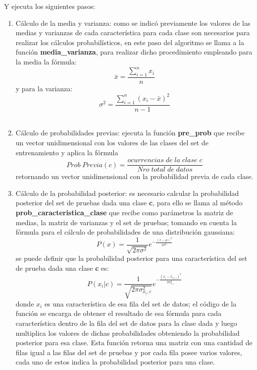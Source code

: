 Y ejecuta los siguientes pasos:
\begin{enumerate}
	\item Cálculo de la media y varianza:
	como se indicó previamente los valores de las medias y varianzas de cada característica para cada clase son necesarios
	para realizar los cálculos probabilísticos, en este paso del algoritmo se llama a la función \textbf{media\_varianza}, para
	realizar dicho procedimiento empleando para la media la fórmula: \[\bar{x}=\frac{\sum_{i=1}^n{x_{i}}}{n}\] y para la varianza:
	\[\sigma^2=\frac{\sum_{i=1}^n{\left(x_{i}-\bar{x}\right)^2}}{n - 1}\]\\
	\item Cálculo de probabilidades previas:
	ejecuta la función \textbf{pre\_prob} que recibe un vector unidimensional con los valores de las clases
	del set de entrenamiento y aplica la fórmula
	\[Prob\;Previa\left(c\right)=\frac{ocurrencias\;de\;la\;clase\;c}{Nro\;total\;de\;datos}\]
	retornando un vector unidimensional con la probabilidad previa de cada clase.\\
	\item Cálculo de la probabilidad posterior:
	es necesario calcular la probabilidad posterior del set de pruebas dada una clase \textbf{c},
	para ello se llama al método \textbf{prob\_caracteristica\_clase} que recibe como
	parámetros la matriz de medias, la matriz de varianzas y el set de pruebas; tomando en cuenta la
	fórmula para el cálculo de probabilidades de una distribución gaussiana:
	\[
	P\left(x\right) = \frac{1}{\sqrt{2\pi\sigma^{2}}}e^{-\frac{\left(x-\mu\right)^{2}}{2\sigma^{2}}}
	\]
	se puede definir que la probabilidad posterior para una característica del set de prueba dada una
	clase \textbf{c} es:
	\[
	P\left(x_{i}|c\right) = \frac{1}{\sqrt{2\pi\sigma^{2}_{x_{i},c}}}
	e^{-\frac{\left(x_{i}-\bar{x}_{x_{i},c}\right)^{2}}{2\sigma^{2}_{x_{i,c}}}}
	\]
	donde $x_{i}$ es una característica de esa fila del set de datos; el código de la función se encarga de
	obtener el resultado de esa fórmula para cada característica dentro de la fila del set de datos para
	la clase dada y luego multiplica los valores de dichas probabilidades obteniendo la probabilidad posterior
	para esa clase. Esta función retorna una matriz con una cantidad de filas igual a las filas del set de
	pruebas y por cada fila posee varios valores, cada uno de estos indica la probabilidad posterior para una clase.\\


\end{enumerate}
